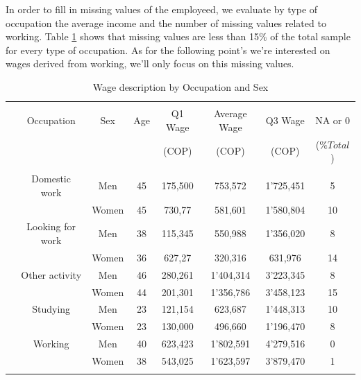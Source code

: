 \documentclass[a4paper,12pt]{article}
\begin{document}
In order to fill in missing values of the employeed, we  evaluate by type of occupation the average income and the number of missing values related to working. Table \ref{tab:WAGES} shows that missing values are less than 15$\%$ of the total sample for every type of occupation. As for the following point's we're interested on wages derived from working, we'll only focus on this missing values.

\begin{table}[!htbp] \centering 
  \caption{Wage description by Occupation and Sex} 
  \label{tab:WAGES} 
\begin{tabular}{@{\extracolsep{5pt}} cccccccc} 
\\[-1.8ex]\hline 
\hline \\[-1.8ex] 
 & Occupation & Sex & Age & Q1 Wage & Average Wage & Q3 Wage & NA or 0 \\ 
 &  &  &  & (COP) & (COP) & (COP)& ($\%Total$) \\ 
\hline \\[-1.8ex] 
 & Domestic work & Men & 45 & 175,500 & 753,572 & 1'725,451 & 5 \\ 
 &  & Women & 45 & 730,77 & 581,601 & 1'580,804 & 10 \\ 
 & Looking for work & Men & 38 & 115,345 & 550,988 & 1'356,020 & 8 \\ 
 &  & Women & 36 & 627,27 & 320,316 & 631,976 & 14 \\ 
 & Other activity & Men & 46 & 280,261 & 1'404,314 & 3'223,345 & 8 \\ 
 &  & Women & 44 & 201,301 & 1'356,786 & 3'458,123 & 15 \\ 
 & Studying & Men & 23 & 121,154 & 623,687 & 1'448,313 & 10 \\ 
 &  & Women & 23 & 130,000 & 496,660 & 1'196,470 & 8 \\ 
 & Working & Men & 40 & 623,423 & 1'802,591 & 4'279,516 & 0 \\ 
 &  & Women & 38 & 543,025 & 1'623,597 & 3'879,470 & 1 \\ 
\hline \\[-1.8ex] 
\end{tabular} 
 \raggedleft %
    \scriptsize %
\end{table} 
\end{document}
